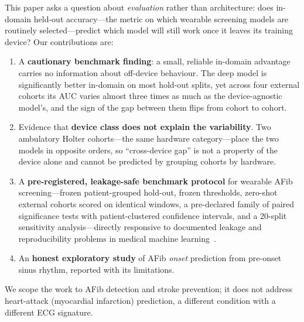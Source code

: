 This paper asks a question about \emph{evaluation} rather than architecture: does
in-domain held-out accuracy---the metric on which wearable screening models are
routinely selected---predict which model will still work once it leaves its
training device? Our contributions are:
\begin{enumerate}
  \item A \textbf{cautionary benchmark finding}: a small, reliable in-domain
  advantage carries no information about off-device behaviour. The deep model is
  significantly better in-domain on most hold-out splits, yet across four external
  cohorts its AUC varies almost three times as much as the device-agnostic model's,
  and the sign of the gap between them flips from cohort to cohort.
  \item Evidence that \textbf{device class does not explain the variability}. Two
  ambulatory Holter cohorts---the same hardware category---place the two models in
  opposite orders, so ``cross-device gap'' is not a property of the device alone
  and cannot be predicted by grouping cohorts by hardware.
  \item A \textbf{pre-registered, leakage-safe benchmark protocol} for wearable
  AFib screening---frozen patient-grouped hold-out, frozen thresholds, zero-shot
  external cohorts scored on identical windows, a pre-declared family of paired
  significance tests with patient-clustered confidence intervals, and a 20-split
  sensitivity analysis---directly responsive to documented leakage and
  reproducibility problems in medical machine learning~\cite{kapoor2023leakage}.
  \item An \textbf{honest exploratory study} of AFib \emph{onset} prediction from
  pre-onset sinus rhythm, reported with its limitations.
\end{enumerate}
We scope the work to AFib detection and stroke prevention; it does not address
heart-attack (myocardial infarction) prediction, a different condition with a
different ECG signature.

